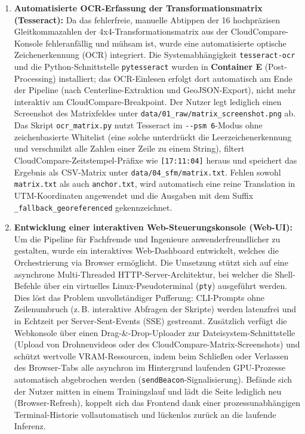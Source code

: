 \documentclass[12pt,a4paper]{article}
\begin{document}
\begin{enumerate}[noitemsep]
    \item \textbf{Automatisierte OCR-Erfassung der Transformationsmatrix (Tesseract):} Da das fehlerfreie, manuelle Abtippen der 16 hochpräzisen Gleitkommazahlen der 4x4-Transformationsmatrix aus der CloudCompare-Konsole fehleranfällig und mühsam ist, wurde eine automatisierte optische Zeichenerkennung (OCR) integriert. Die Systemabhängigkeit \texttt{tesseract-ocr} und die Python-Schnittstelle \texttt{pytesseract} wurden in \textbf{Container E} (Post-Processing) installiert; das OCR-Einlesen erfolgt dort automatisch am Ende der Pipeline (nach Centerline-Extraktion und GeoJSON-Export), nicht mehr interaktiv am CloudCompare-Breakpoint. Der Nutzer legt lediglich einen Screenshot des Matrixfeldes unter \texttt{data/01\_raw/matrix\_screenshot.png} ab. Das Skript \texttt{ocr\_matrix.py} nutzt Tesseract im \texttt{-{}-psm 6}-Modus ohne zeichenbasierte Whitelist (eine solche unterdrückt die Leerzeichenerkennung und verschmilzt alle Zahlen einer Zeile zu einem String), filtert CloudCompare-Zeitstempel-Präfixe wie \texttt{[17:11:04]} heraus und speichert das Ergebnis als CSV-Matrix unter \texttt{data/04\_sfm/matrix.txt}. Fehlen sowohl \texttt{matrix.txt} als auch \texttt{anchor.txt}, wird automatisch eine reine Translation in UTM-Koordinaten angewendet und die Ausgaben mit dem Suffix \texttt{\_fallback\_georeferenced} gekennzeichnet.
    \item \textbf{Entwicklung einer interaktiven Web-Steuerungskonsole (Web-UI):} Um die Pipeline für Fachfremde und Ingenieure anwenderfreundlicher zu gestalten, wurde ein interaktives Web-Dashboard entwickelt, welches die Orchestrierung via Browser ermöglicht. Die Umsetzung stützt sich auf eine asynchrone Multi-Threaded HTTP-Server-Architektur, bei welcher die Shell-Befehle über ein virtuelles Linux-Pseudoterminal (\texttt{pty}) ausgeführt werden. Dies löst das Problem unvollständiger Pufferung: CLI-Prompts ohne Zeilenumbruch (z.\,B. interaktive Abfragen der Skripte) werden latenzfrei und in Echtzeit per Server-Sent-Events (SSE) gestreamt. Zusätzlich verfügt die Webkonsole über einen Drag-\&-Drop-Uploader zur Dateisystem-Schnittstelle (Upload von Drohnenvideos oder des CloudCompare-Matrix-Screenshots) und schützt wertvolle VRAM-Ressourcen, indem beim Schließen oder Verlassen des Browser-Tabs alle asynchron im Hintergrund laufenden GPU-Prozesse automatisch abgebrochen werden (\texttt{sendBeacon}-Signalisierung). Befände sich der Nutzer mitten in einem Trainingslauf und lädt die Seite lediglich neu (Browser-Refresh), koppelt sich das Frontend dank einer prozessunabhängigen Terminal-Historie vollautomatisch und lückenlos zurück an die laufende Inferenz.

\end{enumerate}
\end{document}

